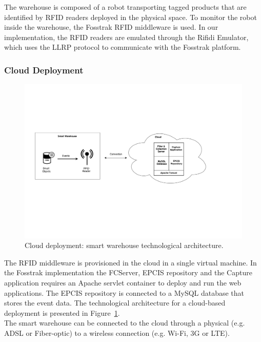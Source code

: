 The warehouse is composed of a robot transporting tagged products that are identified by \gls{RFID} readers
deployed in the physical space. To monitor the robot inside the warehouse, the Fosstrak \gls{RFID} middleware
is used. In our implementation, the \gls{RFID} readers are emulated through the Rifidi Emulator, which uses
the \gls{LLRP} protocol to communicate with the Fosstrak platform.

\subsubsection{Cloud Deployment}
\label{subs:imp_smart_warehouse_cloud}

\begin{figure}
\centering
\includegraphics[width=\textwidth]{./images/implementation_cloud_architecture}
\caption[Cloud deployment: technological architecture.]{Cloud deployment: smart warehouse technological architecture.}
\label{fig:implementation_cloud_architecture}
\end{figure}

The \gls{RFID} middleware is provisioned in the cloud in a single virtual machine. In the
Fosstrak implementation the \gls{FCServer}, \gls{EPCIS} repository and the Capture application
requires an Apache servlet container to deploy and run the web applications. The \gls{EPCIS}
repository is connected to a MySQL database that stores the event data. The technological architecture
for a cloud-based deployment is presented in Figure~\ref{fig:implementation_cloud_architecture}.\\

The smart warehouse can be connected to the cloud through a physical (e.g. \gls{ADSL} or Fiber-optic)
to a wireless connection (e.g. Wi-Fi, 3G or \gls{LTE}).

